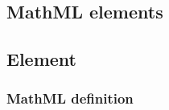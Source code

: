 \subsection{MathML elements}
\label{new-primitive-types}



\subsection{Element}
\label{group-class}

\subsubsection{MathML definition}
\label{group-idname-attributes}



